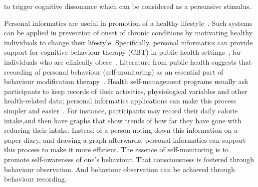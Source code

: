 to trigger cognitive dissonance which can be considered as a persuasive stimulus. 

Personal informatics are useful in promotion of a healthy lifestyle~\citep{korhonen2010personal}. Such systems can be applied in prevention of onset of chronic conditions by motivating healthy individuals to change their lifestyle. Specifically, personal informatics can provide support for cognitive behaviour therapy (CBT) in public health settings~\citep{mattila2008mobile}, for individuals who are clinically obese~\citep{nih2000practical}. Literature from public health suggests that recording of personal behaviour (self-monitoring) as an essential part of behaviour modification therapy~\citep{nih2000practical}. Health self-management programs usually ask participants to keep records of their activities, physiological variables and other health-related data; personal informatics applications can make this process simpler and easier~\citep{medynskiy2010salud}. For instance, participants may record their daily calorie intake,and then have graphs that show trends of how far they have gone with reducing their intake. Instead of a person noting down this information on a paper diary, and drawing a graph afterwards, personal informatics can support this process to make it more efficient. The essence of self-monitoring is to promote self-awareness of one’s behaviour. That consciousness is fostered through behaviour observation. And behaviour observation can be achieved through behaviour recording.  

